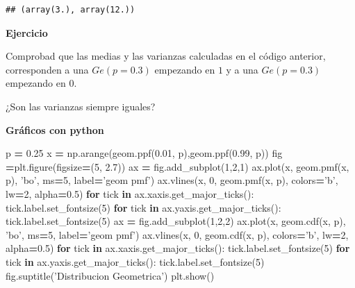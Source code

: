 \documentclass[]{book}
\newenvironment{Shaded}{\begin{snugshade}}{\end{snugshade}}
\newcommand{\ControlFlowTok}[1]{\textcolor[rgb]{0.13,0.29,0.53}{\textbf{#1}}}
\newcommand{\DecValTok}[1]{\textcolor[rgb]{0.00,0.00,0.81}{#1}}
\newcommand{\FloatTok}[1]{\textcolor[rgb]{0.00,0.00,0.81}{#1}}
\newcommand{\KeywordTok}[1]{\textcolor[rgb]{0.13,0.29,0.53}{\textbf{#1}}}
\newcommand{\NormalTok}[1]{#1}
\newcommand{\OperatorTok}[1]{\textcolor[rgb]{0.81,0.36,0.00}{\textbf{#1}}}
\newcommand{\StringTok}[1]{\textcolor[rgb]{0.31,0.60,0.02}{#1}}
\begin{document}
\begin{verbatim}
## (array(3.), array(12.))
\end{verbatim}

\textbf{Ejercicio}

Comprobad que las medias y las varianzas calculadas en el código anterior, corresponden a una \(Ge(p=0.3)\) empezando en \(1\) y a una \(Ge(p=0.3)\) empezando en \(0\).

¿Son las varianzas siempre iguales?

\textbf{Gráficos con python}

\begin{Shaded}
\begin{Highlighting}[]
\NormalTok{p }\OperatorTok{=} \FloatTok{0.25}
\NormalTok{x }\OperatorTok{=}\NormalTok{ np.arange(geom.ppf(}\FloatTok{0.01}\NormalTok{, p),geom.ppf(}\FloatTok{0.99}\NormalTok{, p))}
\NormalTok{fig }\OperatorTok{=}\NormalTok{plt.figure(figsize}\OperatorTok{=}\NormalTok{(}\DecValTok{5}\NormalTok{, }\FloatTok{2.7}\NormalTok{))}
\NormalTok{ax }\OperatorTok{=}\NormalTok{ fig.add_subplot(}\DecValTok{1}\NormalTok{,}\DecValTok{2}\NormalTok{,}\DecValTok{1}\NormalTok{)}
\NormalTok{ax.plot(x, geom.pmf(x, p), }\StringTok{'bo'}\NormalTok{, ms}\OperatorTok{=}\DecValTok{5}\NormalTok{, label}\OperatorTok{=}\StringTok{'geom pmf'}\NormalTok{)}
\NormalTok{ax.vlines(x, }\DecValTok{0}\NormalTok{, geom.pmf(x, p), colors}\OperatorTok{=}\StringTok{'b'}\NormalTok{, lw}\OperatorTok{=}\DecValTok{2}\NormalTok{, alpha}\OperatorTok{=}\FloatTok{0.5}\NormalTok{)}
\ControlFlowTok{for}\NormalTok{ tick }\KeywordTok{in}\NormalTok{ ax.xaxis.get_major_ticks():}
\NormalTok{  tick.label.set_fontsize(}\DecValTok{5}\NormalTok{)}
\ControlFlowTok{for}\NormalTok{ tick }\KeywordTok{in}\NormalTok{ ax.yaxis.get_major_ticks():}
\NormalTok{  tick.label.set_fontsize(}\DecValTok{5}\NormalTok{) }
\NormalTok{ax }\OperatorTok{=}\NormalTok{ fig.add_subplot(}\DecValTok{1}\NormalTok{,}\DecValTok{2}\NormalTok{,}\DecValTok{2}\NormalTok{)}
\NormalTok{ax.plot(x, geom.cdf(x, p), }\StringTok{'bo'}\NormalTok{, ms}\OperatorTok{=}\DecValTok{5}\NormalTok{, label}\OperatorTok{=}\StringTok{'geom pmf'}\NormalTok{)}
\NormalTok{ax.vlines(x, }\DecValTok{0}\NormalTok{, geom.cdf(x, p), colors}\OperatorTok{=}\StringTok{'b'}\NormalTok{, lw}\OperatorTok{=}\DecValTok{2}\NormalTok{, alpha}\OperatorTok{=}\FloatTok{0.5}\NormalTok{)}
\ControlFlowTok{for}\NormalTok{ tick }\KeywordTok{in}\NormalTok{ ax.xaxis.get_major_ticks():}
\NormalTok{  tick.label.set_fontsize(}\DecValTok{5}\NormalTok{)}
\ControlFlowTok{for}\NormalTok{ tick }\KeywordTok{in}\NormalTok{ ax.yaxis.get_major_ticks():}
\NormalTok{  tick.label.set_fontsize(}\DecValTok{5}\NormalTok{)}
\NormalTok{fig.suptitle(}\StringTok{'Distribucion Geometrica'}\NormalTok{)}
\NormalTok{plt.show()}
\end{Highlighting}
\end{Shaded}
\end{document}
